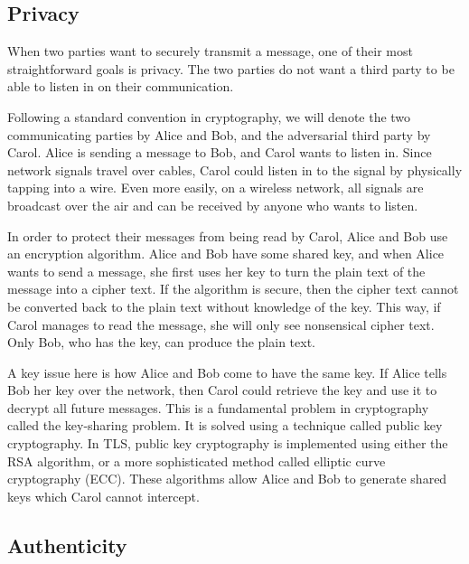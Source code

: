 \subsection{Privacy}

When two parties want to securely transmit a message, one of their most straightforward goals is privacy. The two parties do not want a third party to be able to listen in on their communication.

Following a standard convention in cryptography, we will denote the two communicating parties by Alice and Bob, and the adversarial third party by Carol. Alice is sending a message to Bob, and Carol wants to listen in. Since network signals travel over cables, Carol could listen in to the signal by physically tapping into a wire. Even more easily, on a wireless network, all signals are broadcast over the air and can be received by anyone who wants to listen.

In order to protect their messages from being read by Carol, Alice and Bob use an encryption algorithm. Alice and Bob have some shared key, and when Alice wants to send a message, she first uses her key to turn the plain text of the message into a cipher text. If the algorithm is secure, then the cipher text cannot be converted back to the plain text without knowledge of the key. This way, if Carol manages to read the message, she will only see nonsensical cipher text. Only Bob, who has the key, can produce the plain text.

A key issue here is how Alice and Bob come to have the same key. If Alice tells Bob her key over the network, then Carol could retrieve the key and use it to decrypt all future messages. This is a fundamental problem in cryptography called the key-sharing problem. It is solved using a technique called public key cryptography. In TLS, public key cryptography is implemented using either the RSA algorithm, or a more sophisticated method called elliptic curve cryptography (ECC). These algorithms allow Alice and Bob to generate shared keys which Carol cannot intercept.

\subsection{Authenticity}

